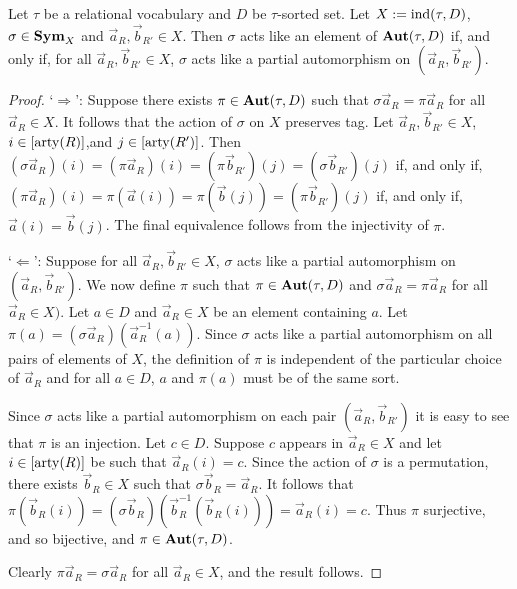 \documentclass[../paper.tex]{subfiles}
\begin{document}
\begin{lem}
  Let $\tau$ be a relational vocabulary and $D$ be $\tau$-sorted set. Let $X :=
  \text{\upshape ind}(\tau, D)$, $\sigma \in \text{\textbf{Sym}}_X$ and $\vec{a}_R, \vec{b}_{R'} \in X$. Then
  $\sigma$ acts like an element of $\text{\textbf{Aut}} (\tau, D)$ if, and only if, for all
  $\vec{a}_R, \vec{b}_{R'} \in X$, $\sigma$ acts like a partial automorphism on
  $(\vec{a}_R, \vec{b}_{R'})$.
  \label{lem:aut-partial}
\end{lem}
\begin{proof}
  `$\Rightarrow$': Suppose there exists $\pi \in \text{\textbf{Aut}}(\tau, D)$ such that
  $\sigma \vec{a}_R = \pi \vec{a}_R$ for all $\vec{a}_R \in X$. It follows that
  the action of $\sigma$ on $X$ preserves tag. Let $\vec{a}_R, \vec{b}_{R'} \in
  X$, $i \in [\mathrm{arty} (R)]$,and $j \in [\mathrm{arty} (R')]$. Then $(\sigma \vec{a}_R) (i)
  = (\pi \vec{a}_R)(i) = (\pi \vec{b}_{R'})(j) = (\sigma \vec{b}_{R'})(j)$ if,
  and only if, $(\pi \vec{a}_R)(i) = \pi (\vec{a}(i)) = \pi (\vec{b}(j)) =
  (\pi\vec{b}_{R'})(j)$ if, and only if, $\vec{a}(i) = \vec{b}(j)$. The final
  equivalence follows from the injectivity of $\pi$.
  
  `$\Leftarrow$': Suppose for all $\vec{a}_R, \vec{b}_{R'} \in X$, $\sigma$ acts
  like a partial automorphism on $(\vec{a}_R, \vec{b}_{R'})$. We now define
  $\pi$ such that $\pi \in \text{\textbf{Aut}}(\tau, D)$ and $\sigma \vec{a}_R = \pi \vec{a}_R$
  for all $\vec{a}_R \in X)$. Let $a \in D$ and $\vec{a}_R \in X$ be an element
  containing $a$. Let $\pi (a) = (\sigma \vec{a}_R) (\vec{a}^{-1}_R(a))$. Since
  $\sigma$ acts like a partial automorphism on all pairs of elements of $X$, the
  definition of $\pi$ is independent of the particular choice of $\vec{a}_R$ and
  for all $a \in D$, $a$ and $\pi (a)$ must be of the same sort.
  
  Since $\sigma$ acts like a partial automorphism on each pair $(\vec{a}_R,
  \vec{b}_{R'})$ it is easy to see that $\pi$ is an injection. Let $c \in D$.
  Suppose $c$ appears in $\vec{a}_R \in X$ and let $i \in [\mathrm{arty}(R)]$ be such
  that $\vec{a}_R(i) = c$. Since the action of $\sigma$ is a permutation, there
  exists $\vec{b}_R \in X$ such that $\sigma \vec{b}_R = \vec{a}_R$. It follows
  that $\pi (\vec{b}_R(i)) = (\sigma \vec{b}_R) (\vec{b}^{-1}_R(\vec{b}_R(i))) =
  \vec{a}_R(i) = c$. Thus $\pi$ surjective, and so bijective, and $\pi \in
  \text{\textbf{Aut}}(\tau, D)$.

  Clearly $\pi \vec{a}_R = \sigma \vec{a}_R$ for all $\vec{a}_R \in X$, and the
  result follows.

\end{proof}
\end{document}

